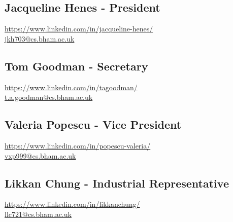 \documentclass{article}
\begin{document}
\subsection*{Jacqueline Henes - President}

\noindent\hspace{1pt}\faLinkedin \hspace{3.5pt} \url{https://www.linkedin.com/in/jacqueline-henes/} \\
\faEnvelope \hspace{0.1cm} \href{mailto:jkh703@cs.bham.ac.uk}{jkh703@cs.bham.ac.uk}

\subsection*{Tom Goodman - Secretary}

\noindent\hspace{1pt}\faLinkedin \hspace{3.5pt} \url{https://www.linkedin.com/in/tagoodman/} \\
\faEnvelope \hspace{0.1cm} \href{mailto:t.a.goodman@cs.bham.ac.uk}{t.a.goodman@cs.bham.ac.uk}

\subsection*{Valeria Popescu - Vice President}

\noindent\hspace{1pt}\faLinkedin \hspace{3.5pt} \url{https://www.linkedin.com/in/popescu-valeria/} \\
\faEnvelope \hspace{0.1cm} \href{mailto:vxp999@cs.bham.ac.uk}{vxp999@cs.bham.ac.uk}

\subsection*{Likkan Chung - Industrial Representative}

\noindent\hspace{1pt}\faLinkedin \hspace{3.5pt} \url{https://www.linkedin.com/in/likkanchung/} \\
\faEnvelope \hspace{0.1cm} \href{mailto:llc721@cs.bham.ac.uk}{llc721@cs.bham.ac.uk}

\vspace{1cm}
\end{document}

